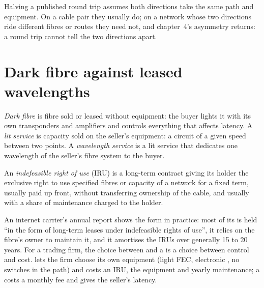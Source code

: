 \begin{remark}\label{rem:nw:long-haul-fibre:half}
Halving a published round trip assumes both directions take the same path and equipment. On a cable pair they usually do; on a network whose
two directions ride different fibres or routes they need not, and chapter~4's asymmetry returns: a round trip cannot tell the two
directions apart.
\end{remark}

\section{Dark fibre against leased wavelengths}

\begin{definition}\label{def:nw:long-haul-fibre:dark}
\emph{Dark fibre} is fibre sold or leased without equipment: the buyer lights it with its own transponders and amplifiers and
controls everything that affects latency. A \emph{lit service} is capacity sold on the seller's equipment: a circuit of a
given speed between two points. A \emph{wavelength service} is a lit service that dedicates one wavelength of the
seller's fibre system to the buyer.
\end{definition}

\begin{definition}\label{def:nw:long-haul-fibre:iru}
An \emph{indefeasible right of use} (IRU) is a long-term contract giving its holder the exclusive right to use
specified fibres or capacity of a network for a fixed term, usually paid up front, without transferring ownership of the cable, and usually
with a share of maintenance charged to the holder.
\end{definition}

An internet carrier's annual report shows the form in practice: most of its  is held ``in the form of long-term leases under
indefeasible rights of use'', it relies on the fibre's owner to maintain it, and it amortises the IRUs over generally 15 to 20 years. For a
trading firm, the choice between  and a  is a choice between control and cost.  lets the firm choose its own
equipment (light FEC, electronic , no switches in the path) and costs an IRU, the equipment and yearly maintenance; a
 costs a monthly fee and gives the seller's latency.

